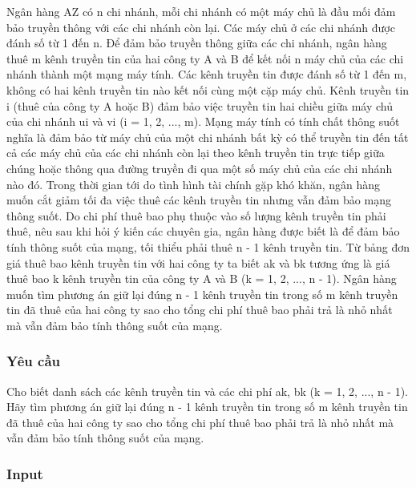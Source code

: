 

Ngân hàng AZ có n chi nhánh, mỗi chi nhánh có một máy chủ là đầu mối đảm bảo truyền thông với các chi nhánh còn lại. Các máy chủ ở các chi nhánh được đánh số từ 1 đến n. Để đảm bảo truyền thông giữa các chi nhánh, ngân hàng thuê m kênh truyền tin của hai công ty A và B để kết nối n máy chủ của các chi nhánh thành một mạng máy tính. Các kênh truyền tin được đánh số từ 1 đến m, không có hai kênh truyền tin nào kết nối cùng một cặp máy chủ. Kênh truyền tin i (thuê của công ty A hoặc B) đảm bảo việc truyền tin hai chiều giữa máy chủ của chi nhánh ui và vi (i = 1, 2, ..., m). Mạng máy tính có tính chất thông suốt nghĩa là đảm bảo từ máy chủ của một chi nhánh bất kỳ có thể truyền tin đến tất cả các máy chủ của các chi nhánh còn lại theo kênh truyền tin trực tiếp giữa chúng hoặc thông qua đường truyền đi qua một số máy chủ của các chi nhánh nào đó. Trong thời gian tới do tình hình tài chính gặp khó khăn, ngân hàng muốn cắt giảm tối đa việc thuê các kênh truyền tin nhưng vẫn đảm bảo mạng thông suốt. Do chi phí thuê bao phụ thuộc vào số lượng kênh truyền tin phải thuê, nêu sau khi hỏi ý kiến các chuyên gia, ngân hàng được biết là để đảm bảo tính thông suốt của mạng, tối thiểu phải thuê n - 1 kênh truyền tin. Từ bảng đơn giá thuê bao kênh truyền tin với hai công ty ta biết ak và bk tương ứng là giá thuê bao k kênh truyền tin của công ty A và B (k = 1, 2, ..., n - 1). Ngân hàng muốn tìm phương án giữ lại đúng n - 1 kênh truyền tin trong số m kênh truyền tin đã thuê của hai công ty sao cho tổng chi phí thuê bao phải trả là nhỏ nhất mà vẫn đảm bảo tính thông suốt của mạng.

\subsubsection{Yêu cầu}

Cho biết danh sách các kênh truyền tin và các chi phí ak, bk (k = 1, 2, ..., n - 1). Hãy tìm phương án giữ lại đúng n - 1 kênh truyền tin trong số m kênh truyền tin đã thuê của hai công ty sao cho tổng chi phí thuê bao phải trả là nhỏ nhất mà vẫn đảm bảo tính thông suốt của mạng.

\subsubsection{Input}


